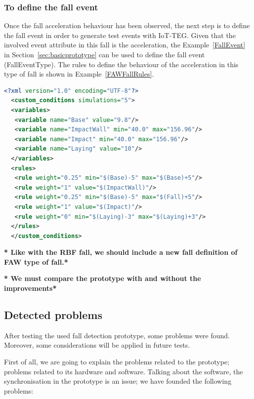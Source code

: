 \documentclass[conference]{IEEEtran}
\theoremstyle{definition}
\begin{document}
\subsubsection*{To define the fall event} Once the fall acceleration behaviour has been observed, the next step is to define the 
fall event in order to generate test events with IoT-TEG. Given that the involved event attribute in this fall is the acceleration, 
the Example~\ref{FallEvent} in Section~\ref{sec:basicprototype} can be used to define the fall event (FallEventType). The rules to
define the behaviour of the acceleration in this type of fall is shown in Example~\ref{FAWFallRules}.

\begin{lstlisting}[basicstyle=\ttfamily\footnotesize,language=XML,caption={Rules to define a FAW fall},label=FAWFallRules]
  <?xml version="1.0" encoding="UTF-8"?>
  <custom_conditions simulations="5">
  <variables>
   <variable name="Base" value="9.8"/>
   <variable name="ImpactWall" min="40.0" max="156.96"/>
   <variable name="Impact" min="40.0" max="156.96"/>
   <variable name="Laying" value="10"/>
  </variables>
  <rules>
   <rule weight="0.25" min="$(Base)-5" max="$(Base)+5"/>
   <rule weight="1" value="$(ImpactWall)"/>
   <rule weight="0.25" min="$(Base)-5" max="$(Fall)+5"/>
   <rule weight="1" value="$(Impact)"/>
   <rule weight="0" min="$(Laying)-3" max="$(Laying)+3"/>
  </rules>
  </custom_conditions>
\end{lstlisting}

\textbf{* Like with the RBF fall, we should include a new fall definition of FAW type of fall.*}

\textbf{* We must compare the prototype with and without the improvements*}

\subsection{Detected problems}

After testing the used fall detection prototype, some problems were 
found. Moreover, some considerations will be applied in future tests.

First of all, we are going to explain the problems related to the prototype; problems related to its hardware and
software. Talking about the software, the synchronisation in the prototype is an issue; we have founded the following problems:
\end{document}
